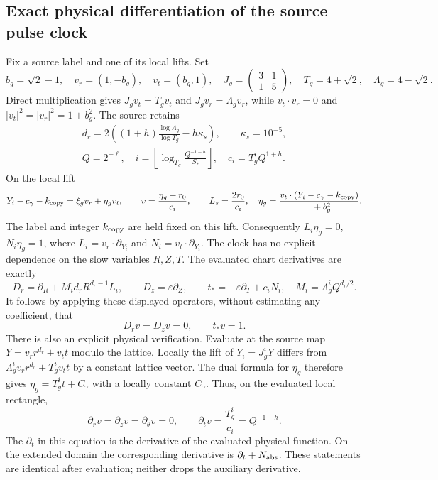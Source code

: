 \subsection{Exact physical differentiation of the source pulse clock}

Fix a source label and one of its local lifts. Set
\[
 b_g=\sqrt2-1,\quad v_r=(1,-b_g),\quad v_t=(b_g,1),\quad
 J_g=\begin{pmatrix}3&1\\1&5\end{pmatrix},\quad
 T_g=4+\sqrt2,\quad\Lambda_g=4-\sqrt2.
\]
Direct multiplication gives $J_gv_t=T_gv_t$ and
$J_gv_r=\Lambda_gv_r$, while $v_t\cdot v_r=0$ and
$|v_t|^2=|v_r|^2=1+b_g^2$. The source retains
\[
\begin{gathered}
 d_r=2\left((1+h)\frac{\log\Lambda_g}{\log T_g}-h\kappa_s\right),\qquad
 \kappa_s=10^{-5},\\
 Q=2^{-\ell},\quad
 i=\left\lfloor\log_{T_g}\frac{Q^{-1-h}}{S_*}\right\rfloor,\quad
 c_i=T_g^iQ^{1+h}.
\end{gathered}
\]
On the local lift
\[
 Y_i-c_\gamma-k_{\rm copy}=\xi_gv_r+\eta_gv_t,\qquad
 v=\frac{\eta_g+r_0}{c_i},\qquad L_s=\frac{2r_0}{c_i},
 \quad
 \eta_g=\frac{v_t\cdot(Y_i-c_\gamma-k_{\rm copy})}{1+b_g^2}.
\]
The label and integer $k_{\rm copy}$ are held fixed on this lift.
Consequently $L_i\eta_g=0$, $N_i\eta_g=1$, where
$L_i=v_r\cdot\partial_{Y_i}$ and $N_i=v_t\cdot\partial_{Y_i}$.
The clock has no explicit dependence on the slow variables $R,Z,T$.
The evaluated chart derivatives are exactly
\[
 D_r=\partial_R+M_id_rR^{d_r-1}L_i,\qquad
 D_z=\varepsilon\partial_Z,\qquad
 t_*=-\varepsilon\partial_T+c_iN_i,
 \quad M_i=\Lambda_g^iQ^{d_r/2}.
\]
It follows by applying these displayed operators, without estimating
any coefficient, that
\begin{equation}\label{tgframe:clockchart}
 D_rv=D_zv=0,\qquad t_*v=1.
\end{equation}
There is also an explicit physical verification. Evaluate at the
source map $Y=v_rr^{d_r}+v_tt$ modulo the lattice. Locally the lift of
$Y_i=J_g^iY$ differs from
$\Lambda_g^iv_rr^{d_r}+T_g^iv_tt$ by a constant lattice vector.
The dual formula for $\eta_g$ therefore gives
$\eta_g=T_g^it+C_\gamma$ with a locally constant $C_\gamma$.
Thus, on the evaluated local rectangle,
\begin{equation}\label{tgframe:clockphysical}
 \partial_rv=\partial_zv=\partial_\theta v=0,\qquad
 \partial_tv=\frac{T_g^i}{c_i}=Q^{-1-h}.
\end{equation}
The $\partial_t$ in this equation is the derivative of the evaluated
physical function. On the extended domain the corresponding derivative
is $\partial_t+N_{\rm abs}$. These statements are identical after
evaluation; neither drops the auxiliary derivative.

